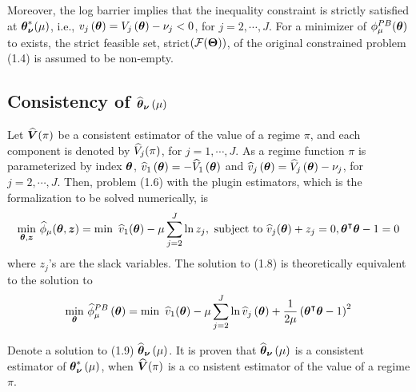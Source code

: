 Moreover, the log barrier implies that the inequality constraint is strictly satisfied at $\boldsymbol{\theta}_{\boldsymbol{\nu}}^{*}(\mu)$, i.e., $v_j\left(\boldsymbol{\theta}\right) = V_j\left(\boldsymbol{\theta}\right) - \nu_j < 0$, for $j = 2, \cdots, J$. For a minimizer of $\phi^{PB}_{\mu}(\boldsymbol{\theta})$ to exists,  the strict feasible set, strict$(\mathcal{F}(\boldsymbol{\Theta}))$, of the original constrained problem (1.4) is assumed to be non-empty. 

\subsection{Consistency of $\widehat{\boldsymbol{\theta}}_{\boldsymbol{\nu}}\left(\mu\right)$}
Let $\widehat{\boldsymbol{V}}(\pi)$ be a consistent estimator of the value of a regime $\pi$, and each component is denoted by $\widehat{V}_j(\pi)$, for $j = 1, \cdots, J$. As a regime function $\pi$ is parameterized by index $\boldsymbol{\theta}$,  $\widehat{v}_1\left(\boldsymbol{\theta}\right)=-\widehat{V}_1\left(\boldsymbol{\theta}\right)$ and  $\widehat{v}_j\left(\boldsymbol{\theta}\right) = \widehat{V}_j\left(\boldsymbol{\theta}\right) - \nu_j$, for $j = 2, \cdots, J$. Then, problem (1.6) with the plugin estimators, which is the formalization to be solved numerically, is 
\begin{equation}
\begin{gathered}
\min_{\boldsymbol{\theta}, \boldsymbol{z}} \, \widehat{\phi}_{\mu}(\boldsymbol{\theta}, \boldsymbol{z}) = \min \,\,\widehat{v}_1(\boldsymbol{\theta}) - \mu \sum_{j=2}^J \ln z_j, \text{ subject to } \widehat{v}_j(\boldsymbol{\theta})  + z_j = 0, \boldsymbol{\theta}^{\intercal}\boldsymbol{\theta} - 1= 0
\end{gathered}
\end{equation}
where $z_j$'s are the slack variables. The solution to (1.8) is theoretically equivalent to the solution to 
\begin{equation}
\begin{gathered}
\min_{\boldsymbol{\theta}} \, \widehat{\phi}^{PB}_{\mu}\left(\boldsymbol{\theta}\right) = \min \,\,\widehat{v}_1(\boldsymbol{\theta}) - \mu \sum_{j=2}^J \ln \widehat{v}_j\left( \boldsymbol{\theta}\right) + \frac{1}{2\mu} \left(\boldsymbol{\theta}^{\intercal}\boldsymbol{\theta} - 1\right)^2
\end{gathered}
\end{equation} 

Denote a solution to (1.9) $\widehat{\boldsymbol{\theta}}_{\boldsymbol{\nu}}\left(\mu\right)$. It is proven that $\widehat{\boldsymbol{\theta}}_{\boldsymbol{\nu}}\left(\mu\right)$ is a consistent estimator of $\boldsymbol{\theta}^*_{\boldsymbol{\nu}}\left(\mu\right)$, when $\widehat{\boldsymbol{V}}(\pi)$ is a co  nsistent estimator of the value of a regime $\pi$.



